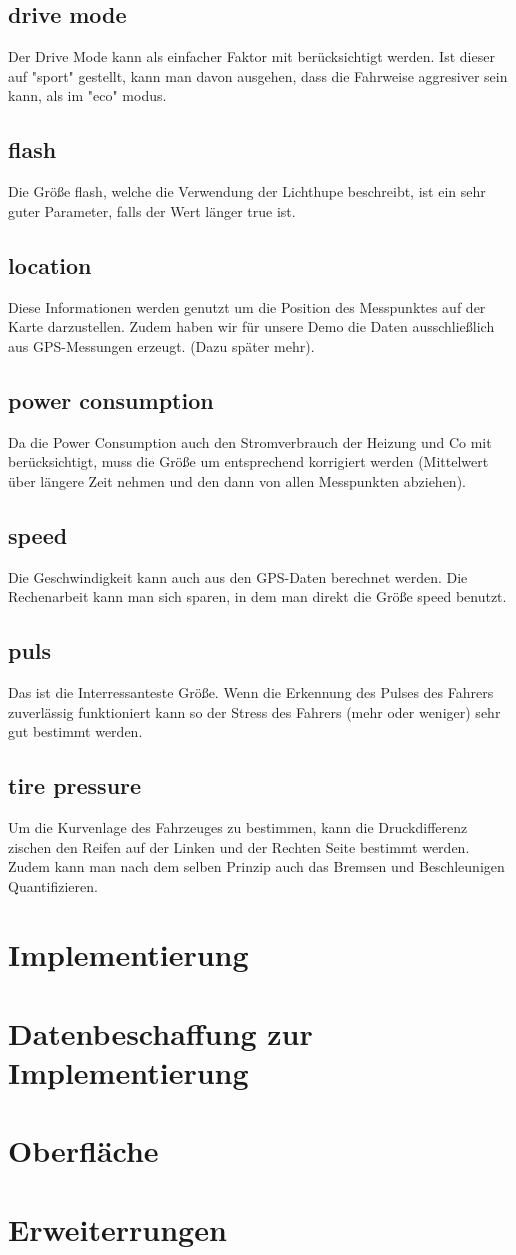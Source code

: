 \documentclass[twocolumn,a4paper,10pt]{IEEEtran}
\begin{document}
	\subsection{drive mode}
		Der Drive Mode kann als einfacher Faktor mit berücksichtigt werden. Ist dieser auf "sport" gestellt, kann man davon ausgehen, dass die Fahrweise aggresiver sein kann, als im "eco" modus.
	\subsection{flash}
		Die Größe flash, welche die Verwendung der Lichthupe beschreibt, ist ein sehr guter Parameter, falls der Wert länger true ist.
	\subsection{location}
		Diese Informationen werden genutzt um die Position des Messpunktes auf der Karte darzustellen. Zudem haben wir für unsere Demo die Daten ausschließlich aus GPS-Messungen erzeugt. (Dazu später mehr).
	\subsection{power consumption}
		Da die Power Consumption auch den Stromverbrauch der Heizung und Co mit berücksichtigt, muss die Größe um entsprechend korrigiert werden (Mittelwert über längere Zeit nehmen und den dann von allen Messpunkten abziehen).
	\subsection{speed}
		Die Geschwindigkeit kann auch aus den GPS-Daten berechnet werden. Die Rechenarbeit kann man sich sparen, in dem man direkt die Größe speed benutzt.
	\subsection{puls}
		Das ist die Interressanteste Größe. Wenn die Erkennung des Pulses des Fahrers zuverlässig funktioniert kann so der Stress des Fahrers (mehr oder weniger) sehr gut bestimmt werden.
	\subsection{tire pressure}
		Um die Kurvenlage des Fahrzeuges zu bestimmen, kann die Druckdifferenz zischen den Reifen auf der Linken und der Rechten Seite bestimmt werden. Zudem kann man nach dem selben Prinzip auch das Bremsen und Beschleunigen Quantifizieren. 
	\subsection{}

\section{Implementierung}
	
	
\section{Datenbeschaffung zur Implementierung}
\section{Oberfläche}
\section{Erweiterrungen}
	
\end{document}
